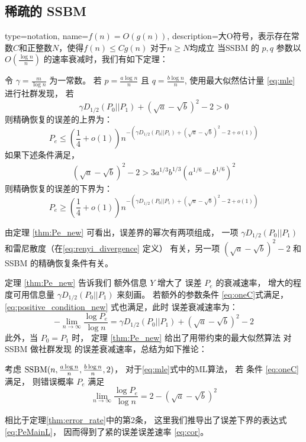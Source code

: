 \subsection{稀疏的 SSBM }
{
  type=notation,
  name={$f(n)=O(g(n))$},
  description={大O符号，表示存在常数$C$和正整数$N$，使得$f(n)\leq C g(n)$ 对于$n\geq N$均成立}
}
当SSBM 的 $p,q$ 参数以 $O(\frac{ \log n}{n})$
的速率衰减时，我们有如下定理：
\begin{theorem}\label{thm:Pe_new}
    令
    $\gamma = \frac{ m}{\log n}$
    为一常数。
    若
    $p = \frac{a \log n }{n} $ 且 $q = 
    \frac{b \log n } {n}$, 使用最大似然估计量 \eqref{eq:mle}
    进行社群发现，
    若
    \begin{equation}\label{eq:positive_condition_new}
    \gamma D_{1/2}(P_0||P_1) +
     (\sqrt{a} - \sqrt{b})^2-2 > 0
    \end{equation}
    则精确恢复的误差的上界为：
    \begin{equation}\label{eq:PeMain}
    P_e \leq (\frac{1}{4}+o(1)) n^{-\left(\gamma D_{1/2}(P_0||P_1) + (\sqrt{a} - \sqrt{b})^2-2 + o(1)\right) }
    \end{equation}
    如果下述条件满足，
    \begin{align}
    (\sqrt{a}-\sqrt{b})^2-2 
    > 3a^{1/3}b^{1/3}(a^{1/6}-b^{1/6})^2\label{eq:oneC}
    \end{align}
    则精确恢复的误差的下界为：
    \begin{equation}\label{eq:PeMainL}
    P_e \geq (\frac{1}{4}+o(1)) n^{-\left(\gamma D_{1/2}(P_0||P_1) + (\sqrt{a} - \sqrt{b})^2-2 + o(1)\right)}
    \end{equation}
\end{theorem}

由定理 \ref{thm:Pe_new}
可看出，误差界的幂次有两项组成，
一项 $\gamma D_{1/2}(P_0||P_1) $ 
和雷尼散度（在\eqref{eq:renyi_divergence} 定义）
有关，另一项 $ (\sqrt{a} - \sqrt{b})^2-2 $
和 SSBM 的精确恢复条件有关。

定理
\ref{thm:Pe_new} 告诉我们
额外信息  $Y$  增大了 误差 $P_e$ 的衰减速率，
增大的程度可用信息量 $\gamma D_{1/2}(P_0||P_1)$ 
来刻画。
若额外的参数条件 \eqref{eq:oneC}式满足，
\eqref{eq:positive_condition_new} 式也满足，此时
误差衰减速率为：
$$
-\lim_{n\to \infty} \frac{\log P_e}{\log n}
= \gamma D_{1/2}(P_0||P_1) + (\sqrt{a} - \sqrt{b})^2-2
$$
此外，当 $P_0=P_1$ 时，
定理 \ref{thm:Pe_new} 
给出了用带约束的最大似然算法
对SSBM 做社群发现
的误差衰减速率，总结为如下推论：
\begin{corollary}\label{cor:sbm}
考虑
$\operatorname{SSBM}(n,\frac{a\log n}{n}, \frac{b \log n}{n}, 2)$，
对于\eqref{eq:mle}式中的ML算法， 
若 条件 \eqref{eq:oneC} 满足，
则错误概率 $P_e$ 满足
\begin{equation}\label{eq:cor}
\lim_{n\to \infty} \frac{\log P_e}{\log n} =2-(\sqrt{a} - \sqrt{b})^2
\end{equation}

\end{corollary}
相比于定理\ref{thm:error_rate}中的第2条，
这里我们推导出了误差下界的表达式 \eqref{eq:PeMainL}，
因而得到了紧的误差误差速率 \eqref{eq:cor}。
